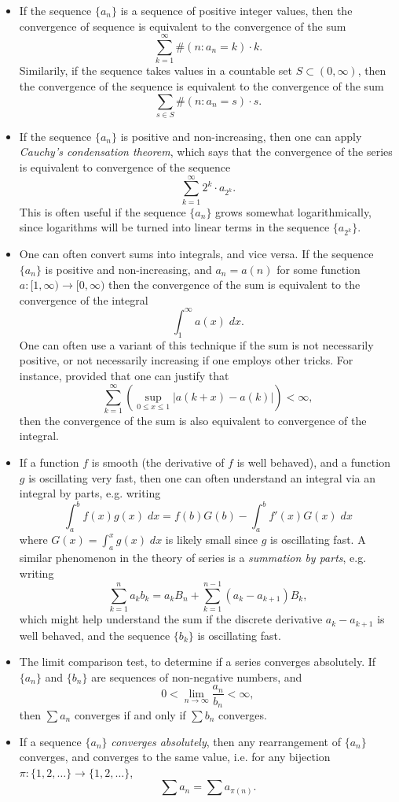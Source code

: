 \documentclass[answers]{exam}
\theoremstyle{problemstyle}
\newcommand{\1}[1]{\textbf{1}_{\left[#1\right]}} %
\begin{document}
\begin{itemize}
	\item If the sequence $\{ a_n \}$ is a sequence of positive integer values, then the convergence of sequence is equivalent to the convergence of the sum
	\[ \sum_{k = 1}^\infty \#(n : a_n = k) \cdot k. \]
	Similarily, if the sequence takes values in a countable set $S \subset (0,\infty)$, then the convergence of the sequence is equivalent to the convergence of the sum
	\[ \sum_{s \in S} \#(n : a_n = s) \cdot s. \]

	\item If the sequence $\{ a_n \}$ is positive and non-increasing, then one can apply \emph{Cauchy's condensation theorem}, which says that the convergence of the series is equivalent to convergence of the sequence
	\[ \sum_{k = 1}^\infty 2^k \cdot a_{2^k}. \]
	This is often useful if the sequence $\{ a_n \}$ grows somewhat logarithmically, since logarithms will be turned into linear terms in the sequence $\{ a_{2^k} \}$.

	\item One can often convert sums into integrals, and vice versa. If the sequence $\{ a_n \}$ is positive and non-increasing, and $a_n = a(n)$ for some function $a: [1,\infty) \to [0,\infty)$ then the convergence of the sum is equivalent to the convergence of the integral
	\[ \int_1^\infty a(x)\; dx. \]
	One can often use a variant of this technique if the sum is not necessarily positive, or not necessarily increasing if one employs other tricks. For instance, provided that one can justify that
	\[ \sum_{k = 1}^\infty \left( \sup_{0 \leq x \leq 1} |a(k + x) - a(k)| \right) < \infty, \]
	then the convergence of the sum is also equivalent to convergence of the integral.

	\item If a function $f$ is smooth (the derivative of $f$ is well behaved), and a function $g$ is oscillating very fast, then one can often understand an integral via an integral by parts, e.g. writing
	\[ \int_a^b f(x) g(x)\; dx = f(b) G(b) - \int_a^b f'(x) G(x)\; dx \]
	where $G(x) = \int_a^x g(x)\; dx$ is likely small since $g$ is oscillating fast. A similar phenomenon in the theory of series is a \emph{summation by parts}, e.g. writing
	\[ \sum_{k = 1}^n a_k b_k = a_k B_n + \sum_{k = 1}^{n-1} (a_k - a_{k+1}) B_k, \]
	which might help understand the sum if the discrete derivative $a_k - a_{k+1}$ is well behaved, and the sequence $\{ b_k \}$ is oscillating fast.

	\item The limit comparison test, to determine if a series converges absolutely. If $\{ a_n \}$ and $\{ b_n \}$ are sequences of non-negative numbers, and
	\[ 0 < \lim_{n \to \infty} \frac{a_n}{b_n} < \infty, \]
	then $\sum a_n$ converges if and only if $\sum b_n$ converges.

	\item If a sequence $\{ a_n \}$ \emph{converges absolutely}, then any rearrangement of $\{ a_n \}$ converges, and converges to the same value, i.e. for any bijection $\pi: \{ 1, 2, \dots \} \to \{ 1, 2, \dots \}$,
	\[ \sum a_n = \sum a_{\pi(n)}. \]
\end{itemize}
\end{document}
